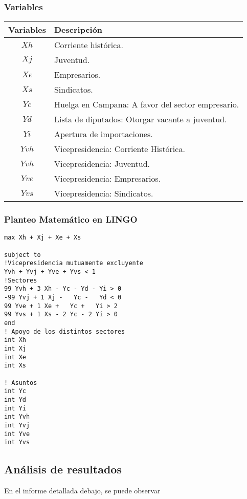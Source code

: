\documentclass[10pt, a4paper, titlepage,
	oneside,
	fleqn, leqno]{article}
\begin{document}
\subsubsection{Variables}

\begin{table}[h!t]
  \centering
  \begin{tabular}{ | c | p{7cm} | }
    \hline
    \textbf{Variables} & \textbf{Descripción} \\ \hline
     \(Xh\)          &  Corriente histórica. \\ \hline
     \(Xj\)          & Juventud. \\ \hline
     \(Xe\)          & Empresarios. \\ \hline
     \(Xs\)          & Sindicatos. \\ \hline
     \(Yc\)          & Huelga en Campana: A favor del sector empresario. \\ \hline
     \(Yd\)          & Lista de diputados: Otorgar vacante a juventud. \\ \hline
     \(Yi\)          & Apertura de importaciones. \\ \hline
     \(Yvh\)          & Vicepresidencia: Corriente Histórica. \\ \hline
     \(Yvh\)          & Vicepresidencia: Juventud. \\ \hline
     \(Yve\)          & Vicepresidencia: Empresarios. \\ \hline
     \(Yvs\)          & Vicepresidencia: Sindicatos. \\ \hline
  \end{tabular}

\end{table}

\subsubsection{Planteo Matemático en LINGO}
\begin{lstlisting}
max Xh + Xj + Xe + Xs

subject to
!Vicepresidencia mutuamente excluyente
Yvh + Yvj + Yve + Yvs < 1
!Sectores
99 Yvh + 3 Xh - Yc - Yd - Yi > 0
-99 Yvj + 1 Xj -   Yc -   Yd < 0 
99 Yve + 1 Xe +   Yc +   Yi > 2  
99 Yvs + 1 Xs - 2 Yc - 2 Yi > 0  
end
! Apoyo de los distintos sectores
int Xh 
int Xj 
int Xe 
int Xs

! Asuntos
int Yc  
int Yd  
int Yi  
int Yvh 
int Yvj 
int Yve 
int Yvs 
\end{lstlisting}
\subsection{Análisis de resultados}
En el informe detallada debajo, se puede observar
\end{document}
